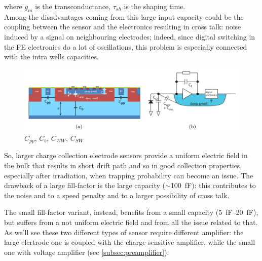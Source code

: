       where $g_m$ is the transconductance, $\tau_{sh}$ is the shaping time. \\
      Among the disadvantages coming from this large input capacity could be the coupling between the sensor and the electronics resulting in cross talk: noise induced by a signal on neighbouring electrodes; indeed, since digital switching in the FE electronics do a lot of oscillations, this problem is especially connected with the intra wells capacities.
      \begin{figure}[h!]
         \centering\includegraphics[width=12cm]{figures/Pixel_detectors/DMAPS_capacity.png}
         \caption{$C_{pp}$, $C_{b}$, $C_{WW}$, $C_{SW}$}
         \label{fig:DMAPS_capacity}
      \end{figure}
      So, larger charge collection electrode sensors provide a uniform electric field in the bulk that results in short drift path and so in good collection properties, especially after irradiation, when trapping probability can become an issue. The drawback of a large fill-factor is the large capacity ($\sim$\SI{100}{fF}): this contributes to the noise and to a speed penalty and to a larger possibility of cross talk.

      The small fill-factor variant, instead, benefits from a small capacity (\SIrange{5}{20}{fF}), but suffers from a not uniform electric field and from all the issue related to that. \\
      As we'll see these two different types of sensor require different amplifier: the large elcrtrode one is coupled with the charge sensitive amplifier, while the small one with voltage amplifier (sec \ref{subsec:preamplifier}).

